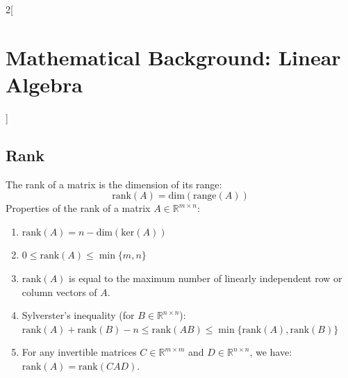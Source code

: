\documentclass[oneside,fontsize=11pt,paper=a4]{scrartcl}
\begin{document}
\begin{multicols}{2}[\section{Mathematical Background: Linear Algebra}]
\subsection{Rank}
The rank of a matrix is the dimension of its range:
\begin{equation*}
    \text{rank}(A) = \text{dim}(\text{range}(A))
\end{equation*}
Properties of the rank of a matrix $A \in \mathbb{R}^{m \times n}$:
\begin{enumerate}
    \item $\text{rank}(A) = n - \text{dim}(\text{ker}(A))$
    \item $0 \leq \text{rank}(A) \leq \min\{m, n\}$
    \item $\text{rank}(A)$ is equal to the maximum number of linearly independent row or column vectors of $A$.
    \item Sylverster's inequality (for $B \in \mathbb{R}^{n \times n}$): $\text{rank}(A) + \text{rank}(B) - n \leq \text{rank}(AB) \leq \min\{\text{rank}(A), \text{rank}(B)\}$
    \item For any invertible matrices $C \in \mathbb{R}^{m \times m}$ and $D \in \mathbb{R}^{n \times n}$, we have: $\text{rank}(A) = \text{rank}(CAD)$.
\end{enumerate}


\end{multicols}
\end{document}
